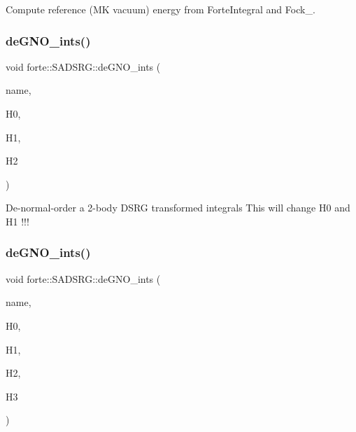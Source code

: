 Compute reference (MK vacuum) energy from Forte\+Integral and Fock\+\_\+. 

\mbox{\label{classforte_1_1_s_a_d_s_r_g_a46976ae7a4ec1a226f47739d22b46265}} 
\subsubsection{\texorpdfstring{de\+G\+N\+O\+\_\+ints()}{deGNO\_ints()}\hspace{0.1cm}{\footnotesize\ttfamily [1/2]}}
{\footnotesize\ttfamily void forte\+::\+S\+A\+D\+S\+R\+G\+::de\+G\+N\+O\+\_\+ints (\begin{DoxyParamCaption}\item[{const std\+::string \&}]{name,  }\item[{double \&}]{H0,  }\item[{Blocked\+Tensor \&}]{H1,  }\item[{Blocked\+Tensor \&}]{H2 }\end{DoxyParamCaption})\hspace{0.3cm}{\ttfamily [protected]}}

De-\/normal-\/order a 2-\/body D\+S\+RG transformed integrals This will change H0 and H1 !!! \mbox{\label{classforte_1_1_s_a_d_s_r_g_ad8d9baf7113dd3c255284977ce563278}} 
\subsubsection{\texorpdfstring{de\+G\+N\+O\+\_\+ints()}{deGNO\_ints()}\hspace{0.1cm}{\footnotesize\ttfamily [2/2]}}
{\footnotesize\ttfamily void forte\+::\+S\+A\+D\+S\+R\+G\+::de\+G\+N\+O\+\_\+ints (\begin{DoxyParamCaption}\item[{const std\+::string \&}]{name,  }\item[{double \&}]{H0,  }\item[{Blocked\+Tensor \&}]{H1,  }\item[{Blocked\+Tensor \&}]{H2,  }\item[{Blocked\+Tensor \&}]{H3 }\end{DoxyParamCaption})\hspace{0.3cm}{\ttfamily [protected]}}

